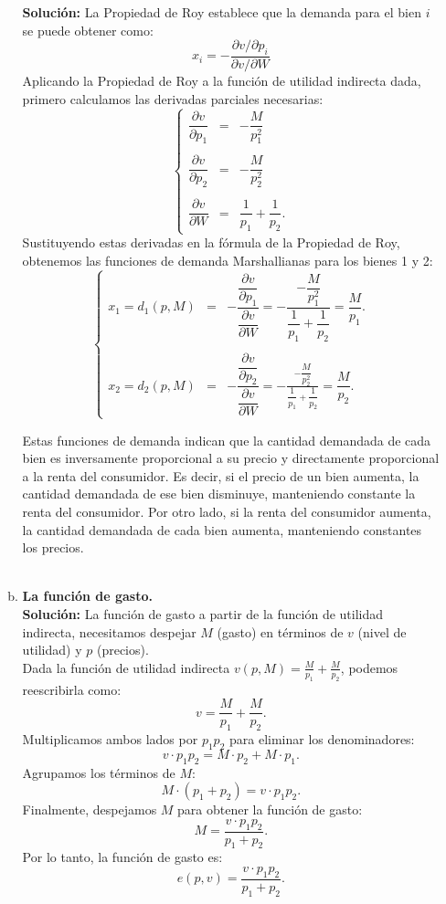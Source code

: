 \begin{enumerate}
\begin{enumerate}[a)]
		\textbf{Solución:} La Propiedad de Roy establece que la demanda para el bien $i$ se puede obtener como:
		$$x_i = -\frac{\partial v/\partial p_i}{\partial v/\partial W}$$
		Aplicando la Propiedad de Roy a la función de utilidad indirecta dada, primero calculamos las derivadas parciales necesarias:
		$$
		\left\{
		\begin{array}{rcl}
		    \dfrac{\partial v}{\partial p_1} &=& -\dfrac{M}{p_1^2}\\\\
		    \dfrac{\partial v}{\partial p_2} &=& -\dfrac{M}{p_2^2}\\\\
		    \dfrac{\partial v}{\partial W} &=& \dfrac{1}{p_1} + \dfrac{1}{p_2}.
		\end{array}
		\right.
		$$
		Sustituyendo estas derivadas en la fórmula de la Propiedad de Roy, obtenemos las funciones de demanda Marshallianas para los bienes 1 y 2:
		$$
		\left\{
		    \begin{array}{rcl}
			x_1 = d_1(p,M) &=&-\dfrac{\dfrac{\partial v}{\partial p_1}}{\dfrac{\partial v}{\partial W}} = -\dfrac{-\dfrac{M}{p_1^2}}{\dfrac{1}{p_1} + \dfrac{1}{p_2}} = \dfrac{M}{p_1}.\\\\
			x_2 = d_2(p,M) &=& -\dfrac{\dfrac{\partial v}{\partial p_2}}{\dfrac{\partial v}{\partial W}} = -\frac{-\dfrac{M}{p_2^2}}{\dfrac{1}{p_1} + \dfrac{1}{p_2}} = \dfrac{M}{p_2}.
		    \end{array}
		\right.
		$$

		Estas funciones de demanda indican que la cantidad demandada de cada bien es inversamente proporcional a su precio y directamente proporcional a la renta del consumidor. Es decir, si el precio de un bien aumenta, la cantidad demandada de ese bien disminuye, manteniendo constante la renta del consumidor. Por otro lado, si la renta del consumidor aumenta, la cantidad demandada de cada bien aumenta, manteniendo constantes los precios.\\\\

	    \item \textbf{La función de gasto.}\\

		\textbf{Solución:} La función de gasto a partir de la función de utilidad indirecta, necesitamos despejar $M$ (gasto) en términos de $v$ (nivel de utilidad) y $p$ (precios).\\

		Dada la función de utilidad indirecta $v(p,M)=\frac{M}{p_1}+\frac{M}{p_2}$, podemos reescribirla como:
		$$v = \frac{M}{p_1}+\frac{M}{p_2}.$$
		Multiplicamos ambos lados por $p_1p_2$ para eliminar los denominadores:
		$$v \cdot p_1p_2 = M \cdot p_2 + M \cdot p_1.$$
		Agrupamos los términos de $M$:
		$$M \cdot (p_1 + p_2) = v \cdot p_1p_2.$$
		Finalmente, despejamos $M$ para obtener la función de gasto:
		$$M = \frac{v \cdot p_1p_2}{p_1 + p_2}.$$
		Por lo tanto, la función de gasto es:
		$$e(p,v) = \frac{v \cdot p_1p_2}{p_1 + p_2}.$$\\



\end{enumerate}
\end{enumerate}
